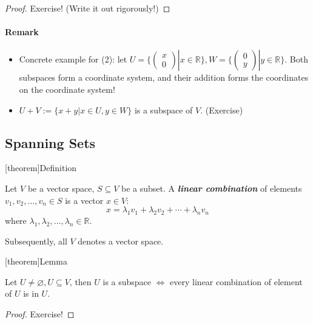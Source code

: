 \documentclass[12pt]{report}
\theoremstyle{definition}
\begin{document}
\begin{proof}
    Exercise! (Write it out rigorously!)
\end{proof}

\paragraph{Remark}
\begin{itemize}
        \item 
    Concrete example for (2): let $U = \{\begin{pmatrix}
            x \\
            0
    \end{pmatrix} | x \in \mathbb{R}\}, W = \{\begin{pmatrix}
            0 \\
            y
    \end{pmatrix} | y \in \mathbb{R}\}$. Both subspaces form a coordinate system,
    and their addition forms the coordinates on the coordinate system!

    \item $U + V := \{x + y | x \in U, y \in W\}$ is a subspace of $V$. (Exercise)
\end{itemize}

\subsection{Spanning Sets}

[theorem]{Definition}
\begin{spanning sets}
    Let $V$ be a vector space, $S \subseteq V$ be a subset.
    A \textbf{\emph{linear combination}} of elements $v_1, v_2, \ldots, v_n \in S$ is a vector $x \in V$:\[
        x = \lambda_1 v_1 + \lambda_2 v_2 + \cdots + \lambda_n v_n
    \]where $\lambda_1, \lambda_2, \ldots, \lambda_n \in \mathbb{R}$.
\end{spanning sets}

Subsequently, all $V$ denotes a vector space.

[theorem]{Lemma}
\begin{subspace and linear combination}
    Let $U \neq \varnothing, U \subseteq V$, then $U$ is a subspace $\iff$
    every linear combination of element of $U$ is in $U$.
\end{subspace and linear combination}

\begin{proof}
    Exercise!
\end{proof}
\end{document}
